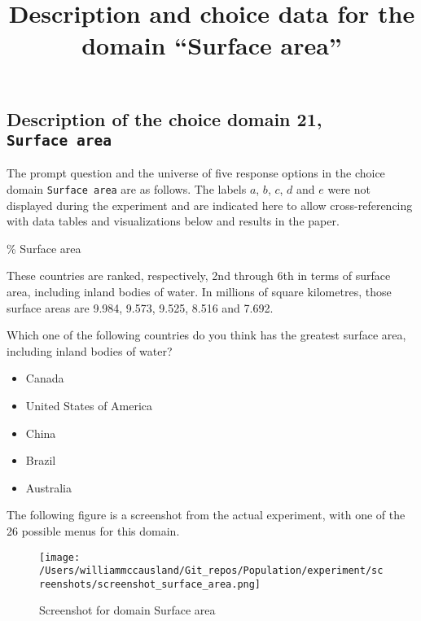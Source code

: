 \documentclass[
]{article}
\title{Description and choice data for the domain ``Surface area''}
\author{}
\date{\vspace{-2.5em}}
\begin{document}
\maketitle

\graphicspath{
  {../experiment/figures/}       %
}

\subsection{\texorpdfstring{Description of the choice domain 21,
\texttt{Surface\ area}}{Description of the choice domain 21, Surface area}}\label{description-of-the-choice-domain-21-surface-area}

The prompt question and the universe of five response options in the
choice domain \texttt{Surface\ area} are as follows. The labels \(a\),
\(b\), \(c\), \(d\) and \(e\) were not displayed during the experiment
and are indicated here to allow cross-referencing with data tables and
visualizations below and results in the paper.

\% Surface area

These countries are ranked, respectively, 2nd through 6th in terms of
surface area, including inland bodies of water. In millions of square
kilometres, those surface areas are 9.984, 9.573, 9.525, 8.516 and
7.692.

\begin{tcolorbox}
Which one of the following countries do you think has the greatest surface area, including inland bodies of water?
    
\begin{itemize}
    \setlength\itemsep{-5pt}
    \item Canada
    \item United States of America
    \item China
    \item Brazil
    \item Australia
\end{itemize}
\end{tcolorbox}

The following figure is a screenshot from the actual experiment, with
one of the 26 possible menus for this domain.

\begin{figure}
\centering
\texttt{[image: /Users/williammccausland/Git\_repos/Population/experiment/screenshots/screenshot\_surface\_area.png]}
\caption{Screenshot for domain Surface area}
\end{figure}
\end{document}
